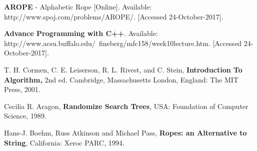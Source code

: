 \begin{thebibliography}{9}
	\textbf{AROPE} - Alphabetic Rope [Online]. Available: http://www.spoj.com/problems/AROPE/. [Accessed 24-October-2017].
	
	\textbf{Advance Programming with C++}. Available: http://www.acsu.buffalo.edu/~fineberg/mfc158/week10lecture.htm. [Accessed 24-October-2017].		
	
	T. H. Cormen, C. E. Leiserson, R. L. Rivest, and C. Stein,
	\textbf{Introduction To Algorithm,} 2nd ed. Cambridge, Massachusetts London, England: The MIT Press, 2001.
	
	Cecilia R. Aragon, \textbf{Randomize Search Trees}, USA: Foundation of Computer Science, 1989.
	
	Hans-J. Boehm, Russ Atkinson and Michael Pass, \textbf{Ropes: an Alternative to String}, California: Xeroc PARC, 1994.
		
\end{thebibliography}
